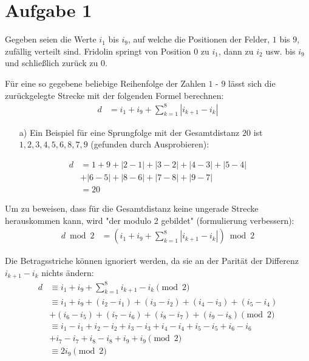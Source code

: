 \documentclass[12pt,a4paper,oneside]{article}
\begin{document}
\pagestyle{fancy}
\fancyhead[L]{\thepage}
\fancyfoot[]{}

\section[]{Aufgabe 1}

Gegeben seien die Werte $i_1$ bis $i_9$, auf welche die Positionen der Felder, $1$ bis $9$, zufällig verteilt sind.
Fridolin springt von Position $0$ zu $i_1$, dann zu $i_2$ usw. bis $i_9$ und schließlich zurück zu $0$.

Für eine so gegebene beliebige Reihenfolge der Zahlen $1$ - $9$ lässt sich die zurückgelegte Strecke mit der folgenden Formel berechnen:
\begin{align*}
	d &= i_1 + i_9 + \sum_{k=1}^{8} |i_{k+1} - i_k|
\end{align*}
\begin{itemize}
	\item[a)] Ein Beispiel für eine Sprungfolge mit der Gesamtdistanz $20$ ist \\
	$1, 2, 3, 4, 5, 6, 8, 7, 9$ (gefunden durch Ausprobieren):
\end{itemize}
\begin{align*}
	d &= 1 + 9 + |2-1|+|3-2|+|4-3|+|5-4| \\
	&+ |6-5|+|8-6|+|7-8|+|9-7| \\
	&= 20
\end{align*}

Um zu beweisen, dass für die Gesamtdistanz keine ungerade Strecke herauskommen kann, wird "der modulo 2 gebildet" (formulierung verbessern):
\begin{align*}
	d \bmod 2 &= \left(i_1 + i_9 + \sum_{k=1}^{8} |i_{k+1} - i_k|\right) \bmod 2
\end{align*}

Die Betragsstriche können ignoriert werden, da sie an der Parität der Differenz $i_{k+1}-i_k$ nichts ändern:
\begin{align*}
	d &\equiv i_1 + i_9 + \sum_{k=1}^{8} i_{k+1} - i_k \pmod 2 \\
	&\equiv i_1 + i_9 + (i_2 - i_1) + (i_3 - i_2) + (i_4 - i_3) + (i_5 - i_4) \\
	&+ (i_6 - i_5) + (i_7 - i_6) + (i_8 - i_7) + (i_9 - i_8) \pmod 2 \\[7pt]
	&\equiv i_1 - i_1 + i_2 - i_2 + i_3 - i_3 + i_4 - i_4 + i_5 - i_5 + i_6 - i_6 \\
	&+ i_7 - i_7 + i_8 - i_8 + i_9 + i_9 \pmod 2 \\[7pt]
	&\equiv 2 i_9 \pmod 2
\end{align*}
\end{document}
